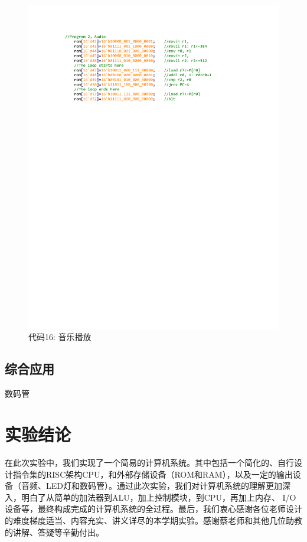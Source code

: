 \documentclass[titlepage, 11pt]{article}
\begin{document}
			\begin{figure}[H]
				\centering
				\includegraphics[scale=1]{38.pdf}
				\caption*{代码16: 音乐播放}
			\end{figure}
		\subsection{综合应用}
		数码管
		
	\section{实验结论}
		在此次实验中，我们实现了一个简易的计算机系统。其中包括一个简化的、自行设计指令集的RISC架构CPU，和外部存储设备（ROM和RAM），以及一定的输出设备（音频、LED灯和数码管）。通过此次实验，我们对计算机系统的理解更加深入，明白了从简单的加法器到ALU，加上控制模块，到CPU，再加上内存、
		I/O设备等，最终构成完成的计算机系统的全过程。最后，我们衷心感谢各位老师设计的难度梯度适当、内容充实、讲义详尽的本学期实验。感谢蔡老师和其他几位助教的讲解、答疑等辛勤付出。
\end{document}
